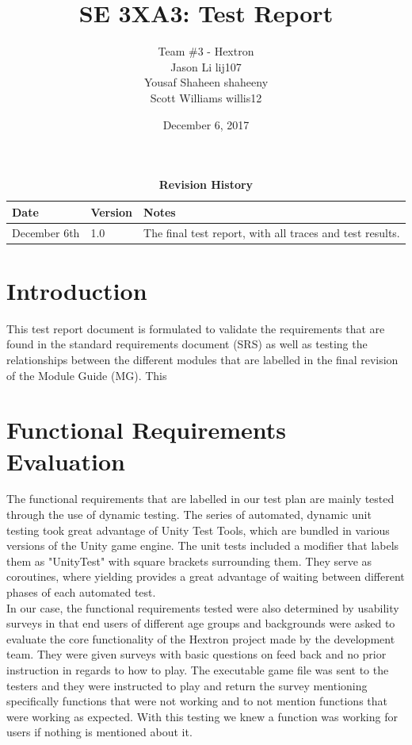 \documentclass[12pt, titlepage]{article}
\title{SE 3XA3: Test Report}
\author{Team \#3 - Hextron
		\\ Jason Li lij107
		\\ Yousaf Shaheen shaheeny
		\\ Scott Williams willis12
}
\date{December 6, 2017}
\begin{document}
\maketitle

\tableofcontents
\listoftables


\begin{table}[bp]
\caption{\bf Revision History}
\begin{tabularx}{\textwidth}{p{3cm}p{2cm}X}
\toprule {\bf Date} & {\bf Version} & {\bf Notes}\\
\midrule
December 6th & 1.0 & The final test report, with all traces and test results.\\
\bottomrule
\end{tabularx}
\end{table}

\newpage


\section{Introduction}
This test report document is formulated to validate the requirements that are found in the standard requirements document (SRS) as well as testing the relationships between the different modules that are labelled in the final revision of the Module Guide (MG). This 

\section{Functional Requirements Evaluation}
The functional requirements that are labelled in our test plan are mainly tested through the use of dynamic testing. The series of automated, dynamic unit testing took great advantage of Unity Test Tools, which are bundled in various versions of the Unity game engine. The unit tests included a modifier that labels them as "UnityTest" with square brackets surrounding them. They serve as coroutines, where yielding provides a great advantage of waiting between different phases of each automated test. \\

In our case, the functional requirements tested were also determined by usability surveys in that end users of different age groups and backgrounds were asked to evaluate the core functionality of the Hextron project made by the development team. They were given surveys with basic questions on feed back and no prior instruction in regards to how to play. The executable game file was sent to the testers and they were instructed to play and return the survey mentioning specifically functions that were not working and to not mention functions that were working as expected. With this testing we knew a function was working for users if nothing is mentioned about it.\\
\end{document}

